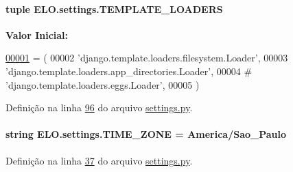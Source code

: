 \hypertarget{namespaceELO_1_1settings_a9c876284f3865d5a15a73bedccfe3bb7}{}
\paragraph[{T\+E\+M\+P\+L\+A\+T\+E\+\_\+\+L\+O\+A\+D\+E\+R\+S}]{\setlength{\rightskip}{0pt plus 5cm}tuple E\+L\+O.\+settings.\+T\+E\+M\+P\+L\+A\+T\+E\+\_\+\+L\+O\+A\+D\+E\+R\+S}\label{namespaceELO_1_1settings_a9c876284f3865d5a15a73bedccfe3bb7}
{\bfseries Valor Inicial\+:}
\begin{DoxyCode}
\hypertarget{namespaceELO_1_1settings_l00001}{}\hyperlink{namespaceELO_1_1settings}{00001} = (
00002     \textcolor{stringliteral}{'django.template.loaders.filesystem.Loader'},
00003     \textcolor{stringliteral}{'django.template.loaders.app\_directories.Loader'},
00004 \textcolor{comment}{#     'django.template.loaders.eggs.Loader',}
00005 )
\end{DoxyCode}


Definição na linha \hyperlink{settings_8py_source_l00096}{96} do arquivo \hyperlink{settings_8py_source}{settings.\+py}.

\hypertarget{namespaceELO_1_1settings_aafd318ffa70db1890eaf1f8621e19d53}{}
\paragraph[{T\+I\+M\+E\+\_\+\+Z\+O\+N\+E}]{\setlength{\rightskip}{0pt plus 5cm}string E\+L\+O.\+settings.\+T\+I\+M\+E\+\_\+\+Z\+O\+N\+E = \textquotesingle{}America/Sao\+\_\+\+Paulo\textquotesingle{}}\label{namespaceELO_1_1settings_aafd318ffa70db1890eaf1f8621e19d53}


Definição na linha \hyperlink{settings_8py_source_l00037}{37} do arquivo \hyperlink{settings_8py_source}{settings.\+py}.

\hypertarget{namespaceELO_1_1settings_a2d03ced1be44b9d7937bdbc870474ffe}{}
